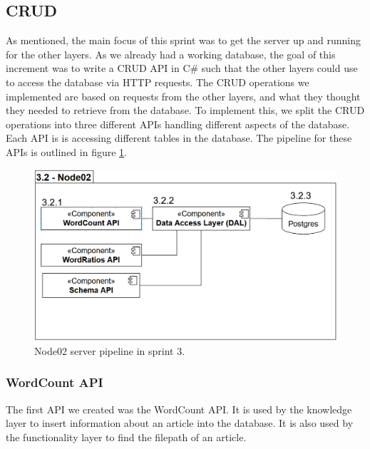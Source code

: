 \subsection{CRUD}

As mentioned, the main focus of this sprint was to get the server up and running for the other layers. 
As we already had a working database, the goal of this increment was to write a CRUD API in C\# such that the other layers could use to access the database via HTTP requests.
The CRUD operations we implemented are based on requests from the other layers, and what they thought they needed to retrieve from the database.
To implement this, we split the CRUD operations into three different APIs handling different aspects of the database. Each API is is accessing different tables in the database.
The pipeline for these APIs is outlined in figure \ref{Node02Sprint3}.

\begin{figure}[h]
    \centering
    \includegraphics[width=\linewidth]{Images/Node02Sprint3.PNG}
    \caption{Node02 server pipeline in sprint 3.}
    \label{Node02Sprint3}
\end{figure}

\subsubsection{WordCount API}

The first API we created was the WordCount API. It is used by the knowledge layer to insert information about an article into the database. It is also used by the functionality layer to find the filepath of an article.

